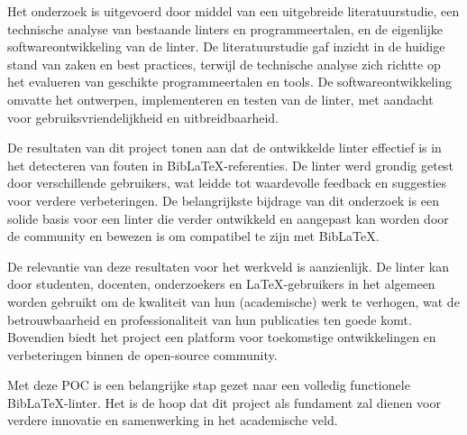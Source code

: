 Het onderzoek is uitgevoerd door middel van een uitgebreide literatuurstudie, een technische analyse van bestaande linters en programmeertalen, en de eigenlijke softwareontwikkeling van de linter. De literatuurstudie gaf inzicht in de huidige stand van zaken en best practices, terwijl de technische analyse zich richtte op het evalueren van geschikte programmeertalen en tools. De softwareontwikkeling omvatte het ontwerpen, implementeren en testen van de linter, met aandacht voor gebruiksvriendelijkheid en uitbreidbaarheid.

De resultaten van dit project tonen aan dat de ontwikkelde linter effectief is in het detecteren van fouten in BibLaTeX-referenties. De linter werd grondig getest door verschillende gebruikers, wat leidde tot waardevolle feedback en suggesties voor verdere verbeteringen. De belangrijkste bijdrage van dit onderzoek is een solide basis voor een linter die verder ontwikkeld en aangepast kan worden door de community en bewezen is om compatibel te zijn met BibLaTeX.

De relevantie van deze resultaten voor het werkveld is aanzienlijk. De linter kan door studenten, docenten, onderzoekers en \LaTeX-gebruikers in het algemeen worden gebruikt om de kwaliteit van hun (academische) werk te verhogen, wat de betrouwbaarheid en professionaliteit van hun publicaties ten goede komt. Bovendien biedt het project een platform voor toekomstige ontwikkelingen en verbeteringen binnen de open-source community.

Met deze \acrlong{POC} is een belangrijke stap gezet naar een volledig functionele BibLaTeX-linter. Het is de hoop dat dit project als fundament zal dienen voor verdere innovatie en samenwerking in het academische veld.

